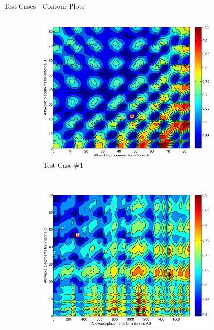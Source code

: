 \documentclass{beamer}
\begin{document}
\begin{frame}{Test Cases - Contour Plots}
    \begin{columns}
        \begin{column}{.5\columnwidth}
            \begin{figure}
                    \vspace*{-.8cm}
                \begin{subfigure}{\columnwidth}
                    \centering
                    \includegraphics[trim=5 0 10 0, clip,scale=0.23]{../paper/FIG/tc1_contour}%
                \vspace*{-0.2cm}
                    \caption*{\tiny Test Case \#1}
                \end{subfigure}\hfill\\
                \begin{subfigure}{\columnwidth}
                    \centering
                    \includegraphics[trim=5 0 10 0, clip,scale=0.23]{../paper/FIG/tc3_contour}%

\end{subfigure}
\end{figure}
\end{column}
\end{columns}
\end{frame}
\end{document}
